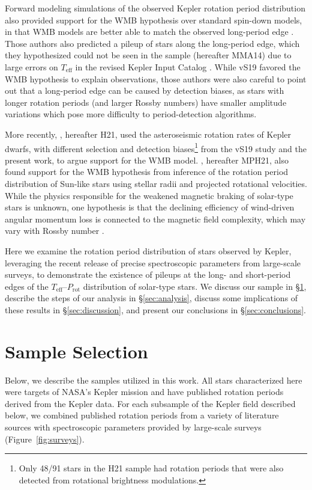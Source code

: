 \documentclass[trackchanges,twocolumn]{aastex631}
\newcommand{\jvs}{vS19\xspace}
\newcommand{\mma}{MMA14\xspace}
\newcommand{\hall}{H21\xspace}
\newcommand{\teff}{\ensuremath{T_{\mathrm{eff}}}\xspace}
\newcommand{\prot}{\ensuremath{P_\mathrm{rot}}\xspace}
\begin{document}
Forward modeling simulations of the observed Kepler rotation period distribution also provided support for the WMB hypothesis over standard spin-down models, in that WMB models are better able to match the observed long-period edge \citep[][hereafter vS19]{vanSaders2019}. Those authors also predicted a pileup of stars along the long-period edge, which they hypothesized could not be seen in the \citet{McQuillan2014} sample (hereafter \mma) due to large errors on \teff in the revised Kepler Input Catalog \citep[KIC,][]{Huber2014}. While \jvs favored the WMB hypothesis to explain observations, those authors were also careful to point out that a long-period edge can be caused by detection biases, as stars with longer rotation periods (and larger Rossby numbers) have smaller amplitude variations which pose more difficulty to period-detection algorithms. 

More recently, \citet{Hall2021}, hereafter H21, used the asteroseismic rotation rates of Kepler dwarfs, with different selection and detection biases\footnote{Only 48/91 stars in the \hall sample had rotation periods that were also detected from rotational brightness modulations.} from the \jvs study and the present work, to argue support for the WMB model. \citet{Masuda2021}, hereafter MPH21, also found support for the WMB hypothesis from inference of the rotation period distribution of Sun-like stars using stellar radii and projected rotational velocities.  While the physics responsible for the weakened magnetic braking of solar-type stars is unknown, one hypothesis is that the declining efficiency of wind-driven angular momentum loss is connected to the magnetic field complexity, which may vary with Rossby number \citep[e.g.][]{Reville2015, vanSaders2016, Garraffo2016, Metcalfe2016, Metcalfe2019}.  

Here we examine the rotation period distribution of stars observed by Kepler, leveraging the recent release of precise spectroscopic parameters from large-scale surveys, to demonstrate the existence of pileups at the long- and short-period edges of the \teff--\prot distribution of solar-type stars. We discuss our sample in \S\ref{sec:sample}, describe the steps of our analysis in \S\ref{sec:analysis}, discuss some implications of these results in \S\ref{sec:discussion}, and present our conclusions in \S\ref{sec:conclusions}.

\section{Sample Selection} \label{sec:sample}
Below, we describe the samples utilized in this work. All stars characterized here were targets of NASA's Kepler mission \citep{Borucki2010} and have published rotation periods derived from the Kepler data. For each subsample of the Kepler field described below, we combined published rotation periods from a variety of literature sources with spectroscopic parameters provided by large-scale surveys (Figure~\ref{fig:surveys}).
\end{document}
